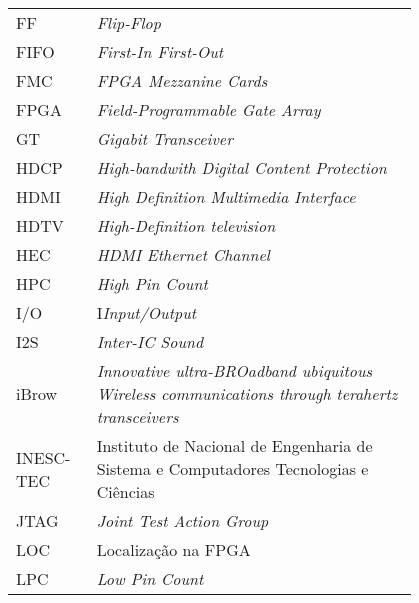 \begin{flushleft}
\begin{longtable}{l p{0.8\linewidth}}
FF        		& \textit{Flip-Flop}                                                                                              \\
FIFO      	& \textit{First-In First-Out}                                                                           \\
FMC       & \textit{FPGA Mezzanine Cards}                                                                         \\
FPGA      & \textit{Field-Programmable Gate Array}                                                                \\
GT        	& \textit{Gigabit Transceiver}                                                                                     \\
HDCP      & \textit{High-bandwith Digital Content Protection}                                                     \\
HDMI      & \textit{High Definition Multimedia Interface}                                                         \\
HDTV      & \textit{High-Definition television}                                                                   \\
HEC       & \textit{HDMI Ethernet Channel}                                                                        \\
HPC       & \textit{High Pin Count}                                                                               \\
I/O       & I\textit{Input/Output}                                                                                            \\
I2S       & \textit{Inter-IC Sound}                                                                              \\
iBrow     & \textit{Innovative ultra-BROadband ubiquitous Wireless communications through terahertz transceivers} \\
INESC-TEC & Instituto de Nacional de Engenharia de Sistema e Computadores Tecnologias e Ciências                    \\
JTAG      & \textit{Joint Test Action Group}                                                                                 \\
LOC       & Localização na FPGA                                                                                     \\
LPC       & \textit{Low Pin Count}                                                                                           \\

\end{longtable}
\end{flushleft}
